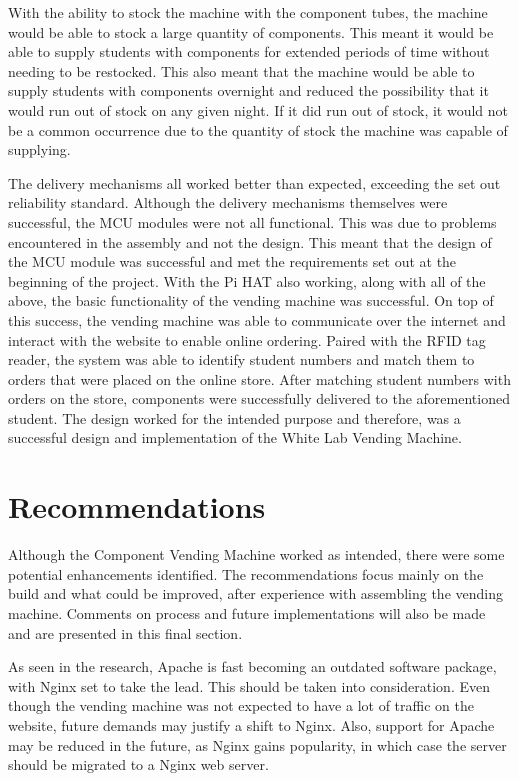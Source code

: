 \documentclass[a4paper,11pt]{article}
\numberwithin{figure}{section}
\numberwithin{table}{section}
\begin{document}
With the ability to stock the machine with the component tubes, the machine would be able to stock a large quantity of components. This meant it would be able to supply students with components for extended periods of time without needing to be restocked. This also meant that the machine would be able to supply students with components overnight and reduced the possibility that it would run out of stock on any given night. If it did run out of stock, it would not be a common occurrence due to the quantity of stock the machine was capable of supplying.

The delivery mechanisms all worked better than expected, exceeding the set out reliability standard. Although the delivery mechanisms themselves were successful, the MCU modules were not all functional. This was due to problems encountered in the assembly and not the design. This meant that the design of the MCU module was successful and met the requirements set out at the beginning of the project. With the Pi HAT also working, along with all of the above, the basic functionality of the vending machine was successful. On top of this success, the vending machine was able to communicate over the internet and interact with the website to enable online ordering. Paired with the RFID tag reader, the system was able to identify student numbers and match them to orders that were placed on the online store. After matching student numbers with orders on the store, components were successfully delivered to the aforementioned student. The design worked for the intended purpose and therefore, was a successful design and implementation of the White Lab Vending Machine.

\newpage

\section{Recommendations}\thispagestyle{sectionstart}
Although the Component Vending Machine worked as intended, there were some potential enhancements identified. The recommendations focus mainly on the build and what could be improved, after experience with assembling the vending machine. Comments on process and future implementations will also be made and are presented in this final section.

As seen in the research, Apache is fast becoming an outdated software package, with Nginx set to take the lead. This should be taken into consideration. Even though the vending machine was not expected to have a lot of traffic on the website, future demands may justify a shift to Nginx. Also, support for Apache may be reduced in the future, as Nginx gains popularity, in which case the server should be migrated to a Nginx web server. 
\end{document}
